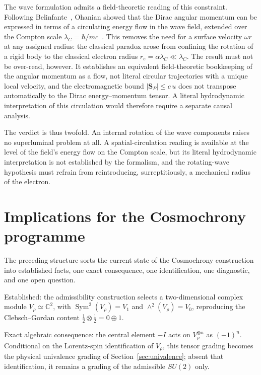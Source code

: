 \documentclass[11pt,a4paper]{article}
\begin{document}
The wave formulation admits a field-theoretic reading of this constraint.
Following Belinfante~\cite{Belinfante1939}, Ohanian showed that the Dirac angular momentum can be expressed
in terms of a circulating energy flow in the wave field, extended over the Compton scale
$\lambda_C = \hbar / mc$~\cite{Ohanian1986}.
This removes the need for a surface velocity $\omega r$ at any assigned radius: the classical paradox arose
from confining the rotation of a rigid body to the classical electron radius
$r_e = \alpha \lambda_C \ll \lambda_C$.
The result must not be over-read, however.
It establishes an equivalent field-theoretic bookkeeping of the angular momentum as a flow, not literal
circular trajectories with a unique local velocity, and the electromagnetic bound
$|\mathbf{S}_P| \le c\, u$ does not transpose automatically to the Dirac energy--momentum tensor.
A literal hydrodynamic interpretation of this circulation would therefore require a separate causal
analysis.

The verdict is thus twofold.
An internal rotation of the wave components raises no superluminal problem at all.
A spatial-circulation reading is available at the level of the field's energy flow on the Compton scale,
but its literal hydrodynamic interpretation is not established by the formalism, and the rotating-wave
hypothesis must refrain from reintroducing, surreptitiously, a mechanical radius of the electron.

\section{Implications for the Cosmochrony programme}
\label{sec:cosmochrony}

The preceding structure sorts the current state of the Cosmochrony construction~\cite{Cosmochrony} into
established facts, one exact consequence, one identification, one diagnostic, and one open question.

Established: the admissibility construction selects a two-dimensional complex module
$V_\rho \simeq \mathbb{C}^2$,
with $\operatorname{Sym}^2(V_\rho) = V_1$ and $\wedge^2(V_\rho) = V_0$, reproducing the Clebsch--Gordan
content $\tfrac12 \otimes \tfrac12 = 0 \oplus 1$.

Exact algebraic consequence: the central element $-I$ acts on $V_\rho^{\otimes n}$ as $(-1)^n$.
Conditional on the Lorentz-spin identification of $V_\rho$, this tensor grading becomes the physical
univalence grading of Section~\ref{sec:univalence}; absent that identification, it remains a grading of the
admissible $SU(2)$ only.
\end{document}

